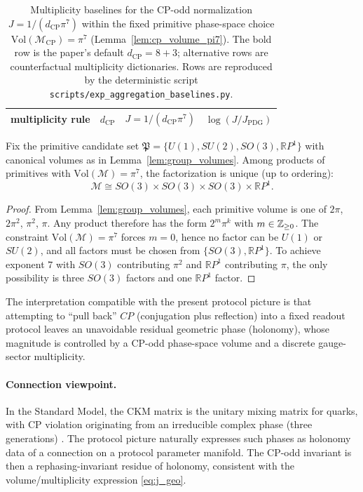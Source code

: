 \begin{table}[t]
\centering
\small
\setlength{\tabcolsep}{8pt}
\renewcommand{\arraystretch}{1.15}
\begin{tabular}{lccc}
\toprule
multiplicity rule & $d_{\mathrm{CP}}$ & $J=1/(d_{\mathrm{CP}}\pi^7)$ & $\log(J/J_{\mathrm{PDG}})$ \\
\midrule
%
\end{tabular}
\caption{Multiplicity baselines for the CP-odd normalization $J=1/(d_{\mathrm{CP}}\pi^7)$ within the fixed primitive phase-space choice $\mathrm{Vol}(\mathcal{M}_{\mathrm{CP}})=\pi^7$ (Lemma~\ref{lem:cp_volume_pi7}).
The bold row is the paper's default $d_{\mathrm{CP}}=8+3$; alternative rows are counterfactual multiplicity dictionaries. Rows are reproduced by the deterministic script \texttt{scripts/exp\_aggregation\_baselines.py}.}
\label{tab:j_multiplicity_baselines}
\end{table}
\begin{proposition}\label{prop:cp_phase_factorization_rigidity}
Fix the primitive candidate set $\mathfrak{P}=\{U(1),SU(2),SO(3),\mathbb{R}P^1\}$ with canonical volumes as in Lemma~\ref{lem:group_volumes}.
Among products of primitives with $\mathrm{Vol}(\mathcal{M})=\pi^7$, the factorization is unique (up to ordering):
\[
\mathcal{M}\cong SO(3)\times SO(3)\times SO(3)\times \mathbb{R}P^1.
\]
\end{proposition}
\begin{proof}
From Lemma~\ref{lem:group_volumes}, each primitive volume is one of $2\pi$, $2\pi^2$, $\pi^2$, $\pi$.
Any product therefore has the form $2^m\pi^k$ with $m\in\mathbb{Z}_{\ge 0}$.
The constraint $\mathrm{Vol}(\mathcal{M})=\pi^7$ forces $m=0$, hence no factor can be $U(1)$ or $SU(2)$, and all factors must be chosen from $\{SO(3),\mathbb{R}P^1\}$.
To achieve exponent $7$ with $SO(3)$ contributing $\pi^2$ and $\mathbb{R}P^1$ contributing $\pi$, the only possibility is three $SO(3)$ factors and one $\mathbb{R}P^1$ factor.
\end{proof}
The interpretation compatible with the present protocol picture is that attempting to ``pull back'' $CP$ (conjugation plus reflection) into a fixed readout protocol leaves an unavoidable residual geometric phase (holonomy), whose magnitude is controlled by a CP-odd phase-space volume and a discrete gauge-sector multiplicity.
\paragraph{Connection viewpoint.}
In the Standard Model, the CKM matrix is the unitary mixing matrix for quarks, with CP violation originating from an irreducible complex phase (three generations) \cite{Cabibbo1963,KobayashiMaskawa1973,PDGRPP2024}.
The protocol picture naturally expresses such phases as holonomy data of a connection on a protocol parameter manifold.
The CP-odd invariant is then a rephasing-invariant residue of holonomy, consistent with the volume/multiplicity expression \eqref{eq:j_geo}.


